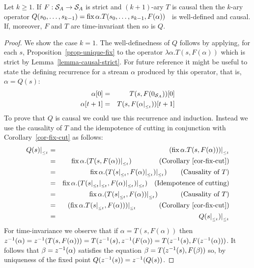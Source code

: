 \begin{corollary}\label{feedback-semantics}
\label{cor-loop}
Let $k\geq1$. If $F: \mathcal{S}_{A} \to \mathcal{S}_{A}$ is strict and $(k+1)$-ary $T$ is causal then the $k$-ary
operator $Q(s_0,\ldots,s_{k-1})=\mbox{fix}\,\alpha.T(s_0,\ldots,s_{k-1},F(\alpha))$~ is well-defined and causal.
If, moreover, $F$ and $T$ are time-invariant then so is $Q$.
\end{corollary}
\begin{proof} We show the case $k=1$.
The well-definedness of $Q$ follows by applying, for each $s$, Proposition~\ref{prop-unique-fix}
to the operator
$\lambda\alpha.T(s,F(\alpha))$ which is strict by Lemma~\ref{lemma-causal-strict}.
For future reference it might be useful to state the defining recurrence for a stream $\alpha$
produced by this operator, that is, $\alpha=Q(s)$:
\begin{eqnarray*}
\alpha[0] & = &  T(s,F(0_{\mathcal{S}_{A}}))[0]\\
\alpha[t+1] & = & T(s,F(\alpha|_{_{\leq t}}))[t+1]
\end{eqnarray*}
To prove that $Q$ is causal we could use this recurrence and induction. Instead
we use the causality of $T$ and the idempotence of cutting in conjunction with
Corollary~\ref{cor-fix-cut} as follows:
\begin{eqnarray*}
Q(s)|_{_{\leq t}} & = &  (\mbox{fix}\,\alpha.T(s,F(\alpha)))|_{_{\leq t}}\\
         & = &  \mbox{fix}\,\alpha.(T(s,F(\alpha))|_{_{\leq t}})~~~~~~~~~~~~\mbox{(Corollary~\ref{cor-fix-cut})}\\
         & = &  \mbox{fix}\,\alpha.(T(s|_{_{\leq t}},F(\alpha)|_{_{\leq t}})|_{_{\leq t}})~~~~~~\mbox{(Causality of $T$)}\\
         & = &  \mbox{fix}\,\alpha.(T(s|_{_{\leq t}}|_{_{\leq t}},F(\alpha)|_{_{\leq t}})|_{_{\leq t}})~~~\mbox{(Idempotence of cutting)}\\
         & = &  \mbox{fix}\,\alpha.(T(s|_{_{\leq t}},F(\alpha))|_{_{\leq t}})~~~~~~~~~~\mbox{(Causality of $T$)}\\
         & = & (\mbox{fix}\,\alpha.T(s|_{_{\leq t}},F(\alpha)))|_{_{\leq t}}~~~~~~~~~~\mbox{(Corollary~\ref{cor-fix-cut})}\\
         & = & Q(s|_{_{\leq t}})|_{_{\leq t}}
\end{eqnarray*}
For time-invariance we observe that if $\alpha=T(s,F(\alpha))$ then $z^{-1}(\alpha)= z^{-1}(T(s,F(\alpha)))=T(z^{-1}(s),z^{-1}(F(\alpha))=
T(z^{-1}(s),F(z^{-1}(\alpha)))$. It follows that $\beta=z^{-1}(\alpha)$ satisfies the equation $\beta=T(z^{-1}(s),F(\beta))$ so,
by uniqueness of the fixed point $Q(z^{-1}(s))=z^{-1}(Q(s))$.
\end{proof}




